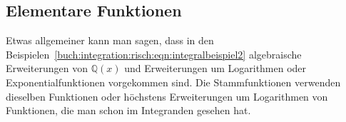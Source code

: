 %
%
%
\subsection{Elementare Funktionen
\label{buch:integral:subsection:elementar}}
Etwas allgemeiner kann man sagen, dass in den
Beispielen~\eqref{buch:integration:risch:eqn:integralbeispiel2}
algebraische Erweiterungen von $\mathbb{Q}(x)$ und Erweiterungen
um Logarithmen oder Exponentialfunktionen vorgekommen sind.
Die Stammfunktionen verwenden dieselben Funktionen oder höchstens
Erweiterungen um Logarithmen von Funktionen, die man schon im
Integranden gesehen hat.

